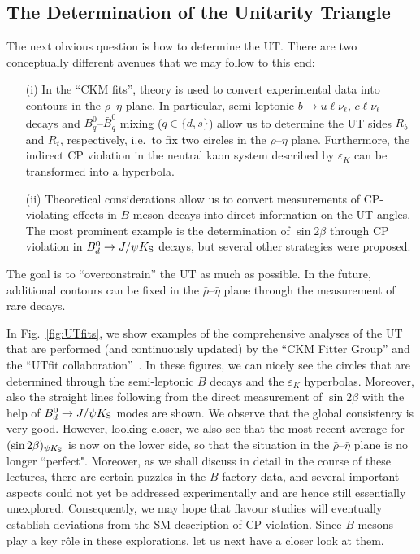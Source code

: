 \documentclass[12pt]{article}
\begin{document}
%
%
%
\subsection{The Determination of the Unitarity Triangle}\label{subsec:CKM-fits}
%
%
%
The next obvious question is how to determine the UT. There are two 
conceptually different avenues that we may follow to this end:
\begin{itemize}
\item[(i)] In the ``CKM fits'', theory is used to convert 
experimental data into contours in the $\bar\rho$--$\bar\eta$ plane. In particular, 
semi-leptonic $b\to u \ell \bar\nu_\ell$, $c \ell \bar\nu_\ell$ decays and 
$B^0_q$--$\bar B^0_q$ mixing ($q\in\{d,s\}$) allow us to determine the UT sides 
$R_b$ and $R_t$, respectively, i.e.\ to fix two circles in the $\bar\rho$--$\bar\eta$ 
plane. Furthermore, the indirect CP violation in the neutral kaon system
described by $\varepsilon_K$ can be transformed into a hyperbola. 
\item[(ii)] Theoretical considerations allow us to convert measurements of 
CP-violating effects in $B$-meson decays into direct information on the UT angles. 
The most prominent example is the determination of $\sin2\beta$ through 
CP violation in $B^0_d\to J/\psi K_{\rm S}$ decays, but several other strategies 
were proposed.
\end{itemize}
The goal is to ``overconstrain'' the UT as much as possible. In the future, 
additional contours can be fixed in the $\bar\rho$--$\bar\eta$ plane through 
the measurement of rare decays. 

In Fig.~\ref{fig:UTfits}, we show examples of the comprehensive
analyses of the UT that are performed (and continuously updated)
by the ``CKM Fitter Group'' \cite{CKMfitter}
and the ``UTfit collaboration''~\cite{UTfit}. In these figures, we can nicely see the
circles that are determined through the semi-leptonic $B$ decays and the 
$\varepsilon_K$ hyperbolas. Moreover, also the straight lines following from the 
direct measurement of $\sin 2\beta$ with the help of $B^0_d\to J/\psi K_{\rm S}$ 
modes are shown. We observe that the global consistency is very good. However,
looking closer, we also see that the most recent average for 
$(\sin 2\beta)_{\psi K_{\rm S}}$ is now on the lower side, so that the situation in 
the $\bar\rho$--$\bar\eta$ plane is no longer ``perfect". Moreover, as we
shall discuss in detail in the course of these lectures, there are certain puzzles in the
$B$-factory data, and several important aspects could not yet be addressed
experimentally and are hence still essentially unexplored. Consequently, we may hope
that flavour studies will eventually establish deviations from the SM description 
of CP violation. Since $B$ mesons play a key r\^ole in these explorations, let us 
next have a closer look at them. 
\end{document}

